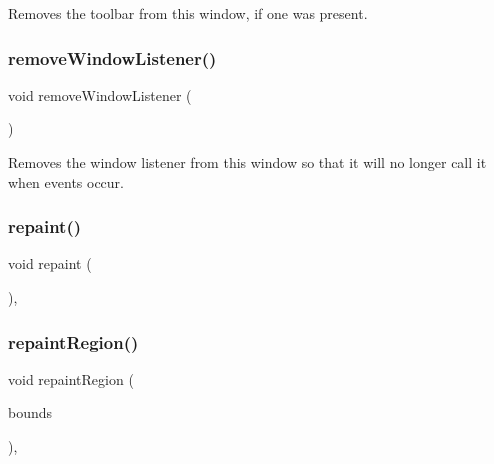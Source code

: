 Removes the toolbar from this window, if one was present. 

\mbox{\label{classsgl_1_1GWindow_ab1ea252520cc160b329cfb5b038add83}} 
\subsubsection{\texorpdfstring{remove\+Window\+Listener()}{removeWindowListener()}}
{\footnotesize\ttfamily void remove\+Window\+Listener (\begin{DoxyParamCaption}{ }\end{DoxyParamCaption})\hspace{0.3cm}{\ttfamily [virtual]}}



Removes the window listener from this window so that it will no longer call it when events occur. 

\mbox{\label{classsgl_1_1GForwardDrawingSurface_afb8dbc55702230f0030e47d6c009697f}} 
\subsubsection{\texorpdfstring{repaint()}{repaint()}}
{\footnotesize\ttfamily void repaint (\begin{DoxyParamCaption}{ }\end{DoxyParamCaption})\hspace{0.3cm}{\ttfamily [override]}, {\ttfamily [inherited]}}

\mbox{\label{classsgl_1_1GDrawingSurface_a769c46fb3e1004aec76e8b0adfa42aa6}} 
\subsubsection{\texorpdfstring{repaint\+Region()}{repaintRegion()}\hspace{0.1cm}{\footnotesize\ttfamily [1/2]}}
{\footnotesize\ttfamily void repaint\+Region (\begin{DoxyParamCaption}\item[{const \mbox{\hyperlink{structsgl_1_1GRectangle}{G\+Rectangle}} \&}]{bounds }\end{DoxyParamCaption})\hspace{0.3cm}{\ttfamily [virtual]}, {\ttfamily [inherited]}}



